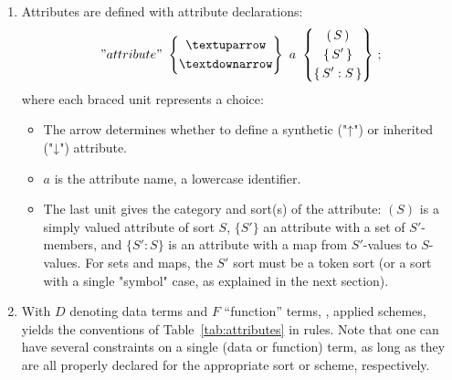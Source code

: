 \documentclass[12pt]{article} %
\begin{document}
\begin{notation}[attributes]\leavevmode
  \begin{enumerate}

  \item Attributes are defined with attribute declarations:
    \begin{displaymath}
      "attribute"
      ~
      \left\{
      \begin{gathered}
        {↑} \\
        {↓}
      \end{gathered}
      \right\}
      ~
      a
      ~
      \left\{
      \begin{gathered}
        (\,S\,) \\
        \{\,S'\,\} \\
        \{\,S' : S\,\}
      \end{gathered}
      \right\}
      \,;
    \end{displaymath}
    where each braced unit represents a choice:
    \begin{itemize}
    \item The arrow determines whether to define a synthetic ("↑") or inherited ("↓") attribute.
    \item $a$ is the attribute name, a lowercase identifier.
    \item The last unit gives the category and sort(s) of the attribute: $(S)$ is a simply valued
      attribute of sort $S$, $\{S'\}$ an attribute with a set of $S'$-members, and $\{S':S\}$ is an
      attribute with a map from $S'$-values to $S$-values. For sets and maps, the $S'$ sort must be
      a token sort (or a sort with a single "symbol" case, as explained in the next section).
    \end{itemize}

  \item With $D$ denoting data terms and $F$ ``function'' terms, \ie, applied schemes, yields the
    conventions of Table~\ref{tab:attributes} in \HAX rules.  Note that one can have several
    constraints on a single (data or function) term, as long as they are all properly declared for
    the appropriate sort or scheme, respectively.

  \end{enumerate}
\end{notation}
\end{document}
